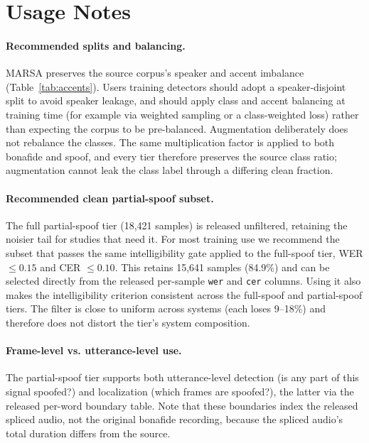 \documentclass[11pt]{article}
\begin{document}
\FloatBarrier
\section*{Usage Notes}

\paragraph{Recommended splits and balancing.} MARSA preserves the source
corpus's speaker and accent imbalance (Table~\ref{tab:accents}). Users
training detectors should adopt a speaker-disjoint split to avoid
speaker leakage, and should apply class and accent balancing at training
time (for example via weighted sampling or a class-weighted loss) rather
than expecting the corpus to be pre-balanced. Augmentation deliberately
does not rebalance the classes. The same multiplication factor is
applied to both bonafide and spoof, and every tier therefore preserves
the source class ratio; augmentation cannot leak the class label
through a differing clean fraction.

\paragraph{Recommended clean partial-spoof subset.} The full partial-spoof
tier (18{,}421 samples) is released unfiltered, retaining the noisier
tail for studies that need it. For most training use we recommend the
subset that passes the same intelligibility gate applied to the
full-spoof tier, WER $\leq 0.15$ and CER $\leq 0.10$. This retains
15{,}641 samples (84.9\%) and can be selected directly from the released
per-sample \texttt{wer} and \texttt{cer} columns. Using it also makes the
intelligibility criterion consistent across the full-spoof and
partial-spoof tiers. The filter is close to uniform across systems
(each loses 9--18\%) and therefore does not distort the tier's system
composition.

\paragraph{Frame-level vs. utterance-level use.} The partial-spoof tier
supports both utterance-level detection (is any part of this signal
spoofed?) and localization (which frames are spoofed?), the latter via
the released per-word boundary table. Note that these boundaries index
the released spliced audio, not the original bonafide recording, because
the spliced audio's total duration differs from the source.
\end{document}
